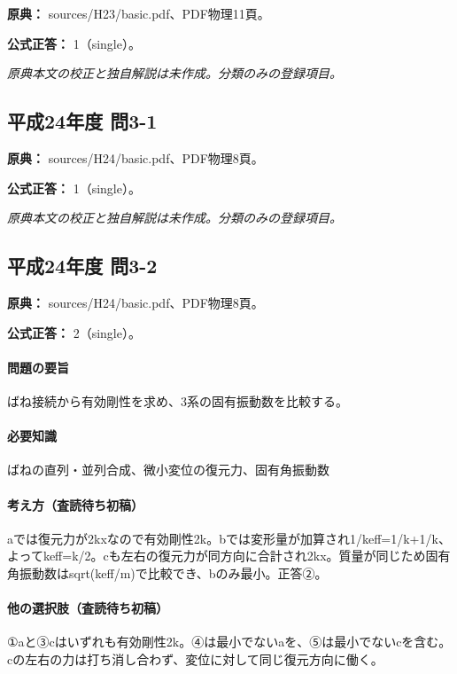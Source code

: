 \noindent\textbf{原典：} sources/H23/basic.pdf、PDF物理11頁。

\textbf{公式正答：} 1（single）。

\par\textit{原典本文の校正と独自解説は未作成。分類のみの登録項目。}

\subsection{平成24年度 問3-1}
\label{q:h24-reg-basic-3-1}

\noindent\textbf{原典：} sources/H24/basic.pdf、PDF物理8頁。

\textbf{公式正答：} 1（single）。

\par\textit{原典本文の校正と独自解説は未作成。分類のみの登録項目。}

\subsection{平成24年度 問3-2}
\label{q:h24-reg-basic-3-2}

\noindent\textbf{原典：} sources/H24/basic.pdf、PDF物理8頁。

\textbf{公式正答：} 2（single）。

\paragraph{問題の要旨} ばね接続から有効剛性を求め、3系の固有振動数を比較する。

\paragraph{必要知識} ばねの直列・並列合成、微小変位の復元力、固有角振動数

\paragraph{考え方（査読待ち初稿）} aでは復元力が2kxなので有効剛性2k。bでは変形量が加算され1/keff=1/k+1/k、よってkeff=k/2。cも左右の復元力が同方向に合計され2kx。質量が同じため固有角振動数はsqrt(keff/m)で比較でき、bのみ最小。正答②。

\paragraph{他の選択肢（査読待ち初稿）} ①aと③cはいずれも有効剛性2k。④は最小でないaを、⑤は最小でないcを含む。cの左右の力は打ち消し合わず、変位に対して同じ復元方向に働く。

